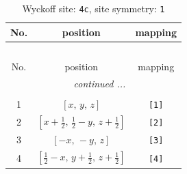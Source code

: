 \documentclass[fleqn,8pt]{jsarticle}
\begin{document}
\renewcommand{\arraystretch}{1.2}
\begin{longtable}{ccc}
\caption{Wyckoff site: {\tt 4c}, site symmetry: {\tt 1}}
 \\
 \hline \hline
No. & position & mapping \\ \hline \endfirsthead

\multicolumn{2}{l}{\tablename\ \thetable{}} \\
 \hline \hline
No. & position & mapping \\ \hline \endhead

 \hline \hline
\multicolumn{2}{r}{\footnotesize\it continued ...} \\ \endfoot

 \hline \hline
\multicolumn{2}{r}{} \\ \endlastfoot

1 & $\left[ x,\, y,\, z \right]$ & {\tt [1]} \\ \hline
2 & $\left[ x + \frac{1}{2},\, \frac{1}{2} - y,\, z + \frac{1}{2} \right]$ & {\tt [2]} \\ \hline
3 & $\left[ - x,\, - y,\, z \right]$ & {\tt [3]} \\ \hline
4 & $\left[ \frac{1}{2} - x,\, y + \frac{1}{2},\, z + \frac{1}{2} \right]$ & {\tt [4]} \\
\end{longtable}
\end{document}
